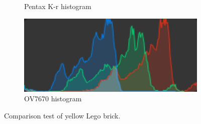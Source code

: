 \begin{figure}
\begin{subfigure}{.5\textwidth}
  \caption{Pentax K-r histogram}
\end{subfigure}%
\begin{subfigure}{.5\textwidth}
  \centering
  \includegraphics[width=1\textwidth]{./img/ov7670_lego_histogram.png}
  \caption{OV7670 histogram}
\end{subfigure}
\caption{Comparison test of yellow Lego brick.}
\label{fig:lego_capture}
\end{figure}

